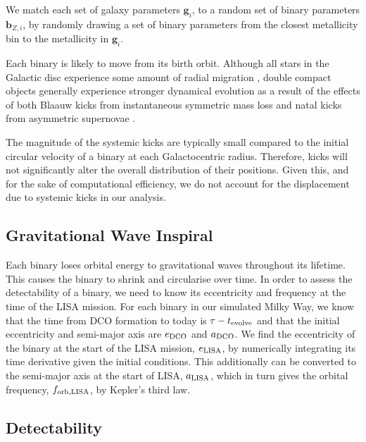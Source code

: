 \documentclass[twocolumn]{aastex63}
\begin{document}
We match each set of galaxy parameters $\mathbf{g}_{{i}}$, to a random set of binary parameters $\mathbf{b}_{{Z, i}}$, by randomly drawing a set of binary parameters from the closest metallicity bin to the metallicity in $\mathbf{g}_{{i}}$.

Each binary is likely to move from its birth orbit. Although all stars in the Galactic disc experience some amount of radial migration \citep{Sellwood+2002, Frankel+2018}, double compact objects generally experience stronger dynamical evolution as a result of the effects of both Blaauw kicks from instantaneous symmetric mass loss \citep{Blaauw+1961} and natal kicks from asymmetric supernovae \citep{Hobbs+2005}.

The magnitude of the systemic kicks are typically small compared to the initial circular velocity of a binary at each Galactocentric radius. Therefore, kicks will not significantly alter the overall distribution of their positions. Given this, and for the sake of computational efficiency, we do not account for the displacement due to systemic kicks in our analysis.

\subsection{Gravitational Wave Inspiral}

Each binary loses orbital energy to gravitational waves throughout its lifetime. This causes the binary to shrink and circularise over time. In order to assess the detectability of a binary, we need to know its eccentricity and frequency at the time of the LISA mission. For each binary in our simulated Milky Way, we know that the time from DCO formation to today is $\tau - t_{\rm evolve}$ and that the initial eccentricity and semi-major axis are $e_{\rm DCO}$ and $a_{\rm DCO}$. We find the eccentricity of the binary at the start of the LISA mission, $e_{\rm LISA}$, by numerically integrating its time derivative \citep[][Eq. 5.13]{Peters+1964} given the initial conditions. This additionally can be converted to the semi-major axis at the start of LISA, $a_{\rm LISA} $\citep[][Eq. 5.11]{Peters+1964}, which in turn gives the orbital frequency, $f_{\rm orb, LISA}$, by Kepler's third law.

\subsection{Detectability}
\end{document}

